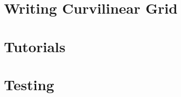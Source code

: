 \documentclass[a4paper,11pt]{article}
\begin{document}
\pagebreak
\section{Writing Curvilinear Grid}



%


\pagebreak
\section{Tutorials}






% 


\pagebreak
\section{Testing}












\end{document}
